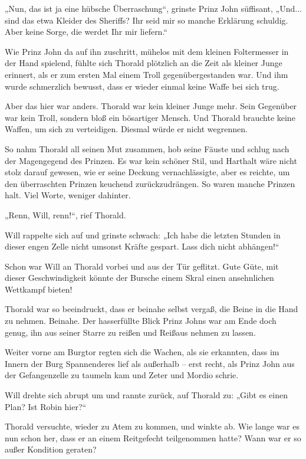 „Nun, das ist ja eine hübsche Überraschung“, grinste Prinz John süffisant, „Und... sind das etwa Kleider des Sheriffs? Ihr seid mir so manche Erklärung schuldig. Aber keine Sorge, die werdet Ihr mir liefern.“

Wie Prinz John da auf ihn zuschritt, mühelos mit dem kleinen Foltermesser in der Hand spielend, fühlte sich Thorald plötzlich an die Zeit als kleiner Junge erinnert, als er zum ersten Mal einem Troll gegenübergestanden war. Und ihm wurde schmerzlich bewusst, dass er wieder einmal keine Waffe bei sich trug.

Aber das hier war anders. Thorald war kein kleiner Junge mehr. Sein Gegenüber war kein Troll, sondern bloß ein bösartiger Mensch. Und Thorald brauchte keine Waffen, um sich zu verteidigen. Diesmal würde er nicht wegrennen.

So nahm Thorald all seinen Mut zusammen, hob seine Fäuste und schlug nach der Magengegend des Prinzen. Es war kein schöner Stil, und Harthalt wäre nicht stolz darauf gewesen, wie er seine Deckung vernachlässigte, aber es reichte, um den überraschten Prinzen keuchend zurückzudrängen. So waren manche Prinzen halt. Viel Worte, weniger dahinter.

„Renn, Will, renn!“, rief Thorald.

Will rappelte sich auf und grinste schwach: „Ich habe die letzten Stunden in dieser engen Zelle nicht umsonst Kräfte gespart. Lass dich nicht abhängen!“

Schon war Will an Thorald vorbei und aus der Tür geflitzt. Gute Güte, mit dieser Geschwindigkeit könnte der Bursche einem Skral einen ansehnlichen Wettkampf bieten!

Thorald war so beeindruckt, dass er beinahe selbst vergaß, die Beine in die Hand zu nehmen. Beinahe. Der hasserfüllte Blick Prinz Johns war am Ende doch genug, ihn aus seiner Starre zu reißen und Reißaus nehmen zu lassen.

Weiter vorne am Burgtor regten sich die Wachen, als sie erkannten, dass im Innern der Burg Spannenderes lief als außerhalb – erst recht, als Prinz John aus der Gefangenzelle zu taumeln kam und Zeter und Mordio schrie.

Will drehte sich abrupt um und rannte zurück, auf Thorald zu: „Gibt es einen Plan? Ist Robin hier?“

Thorald versuchte, wieder zu Atem zu kommen, und winkte ab. Wie lange war es nun schon her, dass er an einem Reitgefecht teilgenommen hatte? Wann war er so außer Kondition geraten?

